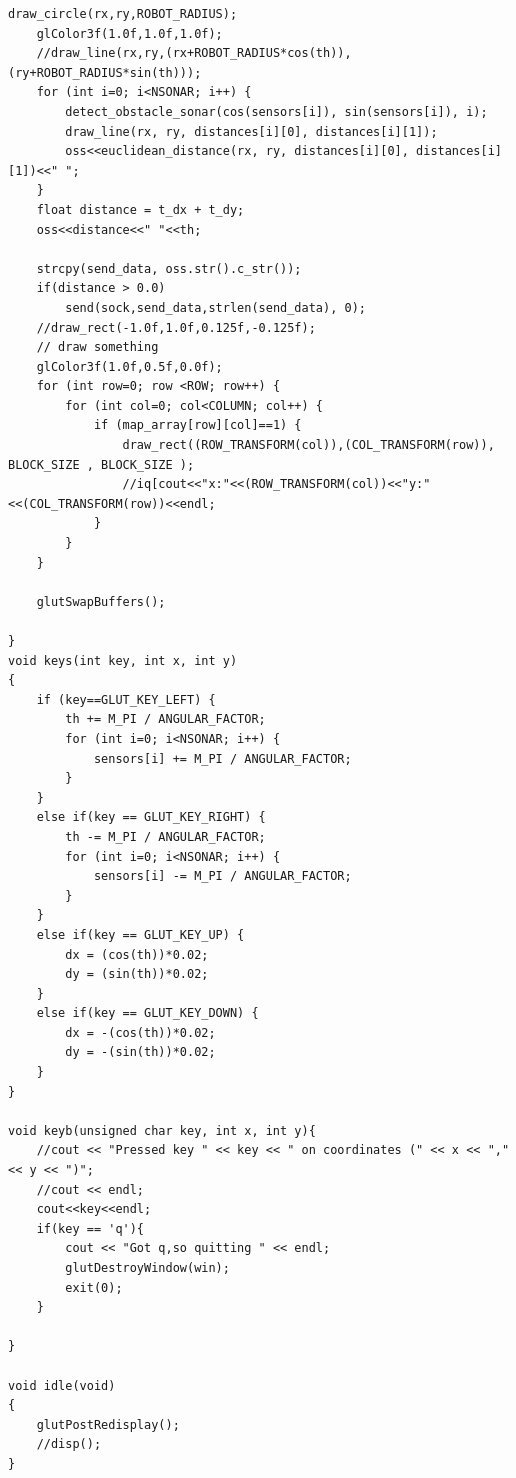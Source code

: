 \documentclass[12pt]{article}
\begin{document}
\begin{lstlisting}[caption="Source code to simulate the stick"]
    draw_circle(rx,ry,ROBOT_RADIUS);
    glColor3f(1.0f,1.0f,1.0f);
    //draw_line(rx,ry,(rx+ROBOT_RADIUS*cos(th)),(ry+ROBOT_RADIUS*sin(th)));
    for (int i=0; i<NSONAR; i++) {
        detect_obstacle_sonar(cos(sensors[i]), sin(sensors[i]), i);
        draw_line(rx, ry, distances[i][0], distances[i][1]);
        oss<<euclidean_distance(rx, ry, distances[i][0], distances[i][1])<<" ";
    }
    float distance = t_dx + t_dy;
    oss<<distance<<" "<<th;
    
    strcpy(send_data, oss.str().c_str());
    if(distance > 0.0)
        send(sock,send_data,strlen(send_data), 0);
    //draw_rect(-1.0f,1.0f,0.125f,-0.125f);
    // draw something
    glColor3f(1.0f,0.5f,0.0f);
    for (int row=0; row <ROW; row++) {
        for (int col=0; col<COLUMN; col++) {
            if (map_array[row][col]==1) {
                draw_rect((ROW_TRANSFORM(col)),(COL_TRANSFORM(row)), BLOCK_SIZE , BLOCK_SIZE );
                //iq[cout<<"x:"<<(ROW_TRANSFORM(col))<<"y:"<<(COL_TRANSFORM(row))<<endl;
            }
        }
    }
     
    glutSwapBuffers();
    
}
void keys(int key, int x, int y)
{
    if (key==GLUT_KEY_LEFT) {
        th += M_PI / ANGULAR_FACTOR;
        for (int i=0; i<NSONAR; i++) {
            sensors[i] += M_PI / ANGULAR_FACTOR;
        }
    }
    else if(key == GLUT_KEY_RIGHT) {
        th -= M_PI / ANGULAR_FACTOR;
        for (int i=0; i<NSONAR; i++) {
            sensors[i] -= M_PI / ANGULAR_FACTOR;
        }
    }
    else if(key == GLUT_KEY_UP) {
        dx = (cos(th))*0.02;
        dy = (sin(th))*0.02;
    }
    else if(key == GLUT_KEY_DOWN) {
        dx = -(cos(th))*0.02;
        dy = -(sin(th))*0.02;
    }
}

void keyb(unsigned char key, int x, int y){
    //cout << "Pressed key " << key << " on coordinates (" << x << "," << y << ")";
    //cout << endl;
    cout<<key<<endl;
    if(key == 'q'){
        cout << "Got q,so quitting " << endl;
        glutDestroyWindow(win);
        exit(0);
    }
    
}

void idle(void)
{
    glutPostRedisplay();
    //disp();
}
\end{lstlisting}
\end{document}
